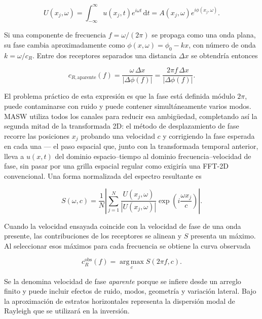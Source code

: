 \begin{equation}
    U(x_j,\omega)=\int_{-\infty}^{\infty}u(x_j,t)
    e^{i\omega t}\,\mathrm{d}t
    =A(x_j,\omega)e^{i\phi(x_j,\omega)}.
\end{equation}

Si una componente de frecuencia $f=\omega/(2\pi)$ se propaga como una onda plana, su
fase cambia aproximadamente como $\phi(x,\omega)=\phi_0-kx$, con número de onda
$k=\omega/c_R$. Entre dos receptores separados una distancia $\Delta x$ se obtendría
entonces

\begin{equation}
    c_{R,\mathrm{aparente}}(f)
    =\frac{\omega\,\Delta x}{|\Delta\phi(f)|}
    =\frac{2\pi f\,\Delta x}{|\Delta\phi(f)|}.
    \label{eq:velocidad-fase-dos-canales}
\end{equation}

El problema práctico de esta expresión es que la fase está definida módulo $2\pi$,
puede contaminarse con ruido y puede contener simultáneamente varios modos. MASW utiliza
todos los canales para reducir esa ambigüedad, completando así la segunda mitad de la
transformada 2D: el método de desplazamiento de fase~\cite{Park1998} recorre las
posiciones $x_j$ probando una velocidad $c$ y corrigiendo la fase esperada en cada una
--- el paso espacial que, junto con la transformada temporal anterior, lleva a
$u(x,t)$ del dominio espacio--tiempo al dominio frecuencia--velocidad de fase, sin pasar
por una grilla espacial regular como exigiría una FFT-2D convencional. Una forma
normalizada del espectro resultante es

\begin{equation}
    S(\omega,c)=\frac{1}{N}\left|
    \sum_{j=1}^{N}
    \frac{U(x_j,\omega)}{|U(x_j,\omega)|}
    \exp\!\left(i\frac{\omega x_j}{c}\right)
    \right|.
    \label{eq:phase-shift}
\end{equation}

Cuando la velocidad ensayada coincide con la velocidad de fase de una onda presente,
las contribuciones de los receptores se alinean y $S$ presenta un máximo. Al seleccionar
esos máximos para cada frecuencia se obtiene la curva observada

\begin{equation}
    c_R^{\mathrm{obs}}(f)=\operatorname*{arg\,max}_{c}S(2\pi f,c).
\end{equation}

Se la denomina velocidad de fase \emph{aparente} porque se infiere desde un arreglo
finito y puede incluir efectos de ruido, modos, geometría y variación lateral. Bajo la
aproximación de estratos horizontales representa la dispersión modal de Rayleigh que se
utilizará en la inversión.

